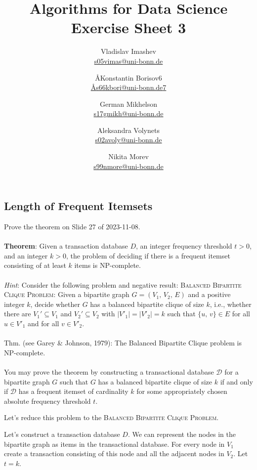 \documentclass{article}
\title{Algorithms for Data Science \\ Exercise Sheet 3}
\author{
  Vladislav Imashev \\ \href{mailto:s05vimas@uni-bonn.de}{s05vimas@uni-bonn.de} \and
  \AA{Konstantin Borisov}{6} \\ \href{mailto:\AA{s66kbori@uni-bonn.de}{7}}{\AA{s66kbori@uni-bonn.de}{7}} \and
  German Mikhelson \\ \href{mailto:s17gmikh@uni-bonn.de}{s17gmikh@uni-bonn.de} \and
  Aleksandra Volynets \\ \href{mailto:s02avoly@uni-bonn.de}{s02avoly@uni-bonn.de} \and
  Nikita Morev \\ \href{mailto:s99nmore@uni-bonn.de}{s99nmore@uni-bonn.de}
}
\begin{document}
  \maketitle

  \setcounter{section}{3}
  \subsection{Length of Frequent Itemsets}
  \begin{centerframebox}
    Prove the theorem on Slide 27 of 2023-11-08.
    \\\\
    \textbf{Theorem}:
    Given a transaction database $D$, an integer frequency threshold $t > 0$, and an integer $k > 0$,
    the problem of deciding if there is a frequent itemset consisting of at least $k$ items is NP-complete.
    \\\\
    \textit{Hint}: Consider the following problem and negative result:
    \textsc{Balanced Bipartite Clique Problem}:
    Given a bipartite graph $G = (V_1,\, V_2,\, E)$ and a positive integer $k$, decide whether $G$ has a balanced
    bipartite clique of size $k$, i.e., whether there are $V_1' \subseteq V_1$ and $V_2' \subseteq V_2$
    with $|V'_1| = |V'_2| = k$ such that $\{u,\, v\} \in E$ for all $u \in V'_1$ and for all $v \in V'_2$.
    \\\\
    Thm. (see Garey \& Johnson, 1979): The Balanced Bipartite Clique problem is NP-complete.
    \\\\
    You may prove the theorem by constructing a transactional database $\mathcal{D}$
    for a bipartite graph $G$ such that $G$ has a balanced bipartite clique of
    size $k$ if and only if $\mathcal{D}$ has a frequent itemset of cardinality $k$ for some
    appropriately chosen absolute frequency threshold $t$.
  \end{centerframebox}
  Let's reduce this problem to the \textsc{Balanced Bipartite Clique Problem}.

  Let's construct a transaction database $D$. We can represent the nodes in the bipartite graph as items in the transactional database. For every node in $V_1$ create a transaction consisting of this node and all the adjacent nodes in $V_2$. Let $t = k$.
\end{document}
